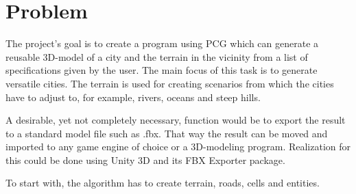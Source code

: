 \section{Problem}
The project’s goal is to create a program using PCG which can generate a reusable 3D-model of a city and the terrain in the vicinity from a list of specifications given by the user.
The main focus of this task is to generate versatile cities.
The terrain is used for creating scenarios from which the cities have to adjust to, for example, rivers, oceans and steep hills.

A desirable, yet not completely necessary, function would be to export the result to a standard model file such as .fbx.
That way the result can be moved and imported to any game engine of choice or a 3D-modeling program.
Realization for this could be done using Unity 3D and its FBX Exporter package.

To start with, the algorithm has to create terrain, roads, cells and entities. 
